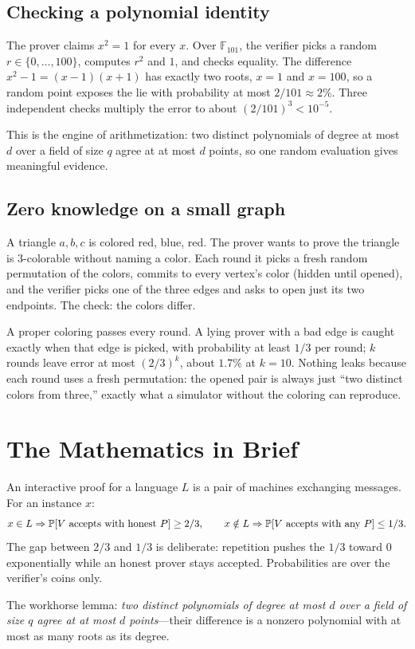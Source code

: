 \subsection{Checking a polynomial identity}
The prover claims $x^2=1$ for every $x$. Over $\mathbb{F}_{101}$, the verifier picks a random $r\in\{0,\ldots,100\}$, computes $r^2$ and $1$, and checks equality. The difference $x^2-1=(x-1)(x+1)$ has exactly two roots, $x=1$ and $x=100$, so a random point exposes the lie with probability at most $2/101\approx2\%$. Three independent checks multiply the error to about $(2/101)^3<10^{-5}$.

This is the engine of arithmetization: two distinct polynomials of degree at most $d$ over a field of size $q$ agree at at most $d$ points, so one random evaluation gives meaningful evidence.

\subsection{Zero knowledge on a small graph}
A triangle $a,b,c$ is colored red, blue, red. The prover wants to prove the triangle is $3$-colorable without naming a color. Each round it picks a fresh random permutation of the colors, commits to every vertex's color (hidden until opened), and the verifier picks one of the three edges and asks to open just its two endpoints. The check: the colors differ.

A proper coloring passes every round. A lying prover with a bad edge is caught exactly when that edge is picked, with probability at least $1/3$ per round; $k$ rounds leave error at most $(2/3)^k$, about $1.7\%$ at $k=10$. Nothing leaks because each round uses a fresh permutation: the opened pair is always just ``two distinct colors from three,'' exactly what a simulator without the coloring can reproduce.

\section{The Mathematics in Brief}
An interactive proof for a language $L$ is a pair of machines exchanging messages. For an instance $x$:
\[
x\in L \Rightarrow \mathbb{P}[V\text{ accepts with honest }P]\geq 2/3,
\qquad
x\notin L \Rightarrow \mathbb{P}[V\text{ accepts with any }P]\leq 1/3.
\]
The gap between $2/3$ and $1/3$ is deliberate: repetition pushes the $1/3$ toward $0$ exponentially while an honest prover stays accepted. Probabilities are over the verifier's coins only.

The workhorse lemma: \emph{two distinct polynomials of degree at most $d$ over a field of size $q$ agree at at most $d$ points}---their difference is a nonzero polynomial with at most as many roots as its degree.

